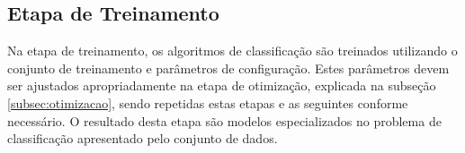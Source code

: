 \subsection{Etapa de Treinamento}
\label{subsec:etapa-treinamento}

Na etapa de treinamento, os algoritmos de classificação são treinados utilizando o conjunto de treinamento e parâmetros de configuração. Estes parâmetros devem ser ajustados apropriadamente na etapa de otimização, explicada na subseção \ref{subsec:otimizacao}, sendo repetidas estas etapas e as seguintes conforme necessário. O resultado desta etapa são modelos especializados no problema de classificação apresentado pelo conjunto de dados.

